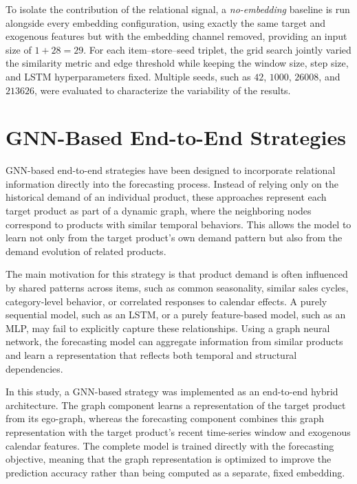 To isolate the contribution of the relational signal, a \emph{no-embedding} baseline is run alongside every embedding configuration, using exactly the same target and exogenous features but with the embedding channel removed, providing an input size of \(1+28=29\). For each item--store--seed triplet, the grid search jointly varied the similarity metric and edge threshold while keeping the window size, step size, and LSTM hyperparameters fixed. Multiple seeds, such as \(42\), \(1000\), \(26008\), and \(213626\), were evaluated to characterize the variability of the results.


\section{GNN-Based End-to-End Strategies}

GNN-based end-to-end strategies have been designed to incorporate relational information directly into the forecasting process. Instead of relying only on the historical demand of an individual product, these approaches represent each target product as part of a dynamic graph, where the neighboring nodes correspond to products with similar temporal behaviors. This allows the model to learn not only from the target product's own demand pattern but also from the demand evolution of related products.

The main motivation for this strategy is that product demand is often influenced by shared patterns across items, such as common seasonality, similar sales cycles, category-level behavior, or correlated responses to calendar effects. A purely sequential model, such as an LSTM, or a purely feature-based model, such as an MLP, may fail to explicitly capture these relationships. Using a graph neural network, the forecasting model can aggregate information from similar products and learn a representation that reflects both temporal and structural dependencies.

In this study, a GNN-based strategy was implemented as an end-to-end hybrid architecture. The graph component learns a representation of the target product from its ego-graph, whereas the forecasting component combines this graph representation with the target product's recent time-series window and exogenous calendar features. The complete model is trained directly with the forecasting objective, meaning that the graph representation is optimized to improve the prediction accuracy rather than being computed as a separate, fixed embedding.

